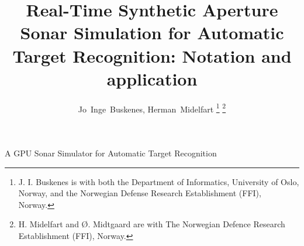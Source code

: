 
\suppressfloats


\title{Real-Time Synthetic Aperture Sonar Simulation for Automatic Target Recognition: Notation and application}

\author{{Jo~Inge~Buskenes, %
        Herman~Midelfart%
        } %
\thanks{J. I. Buskenes is with both the Department of Informatics, University of Oslo, Norway, and the Norwegian Defense Research Establishment (FFI), Norway.}%
\thanks{H. Midelfart and \O. Midtgaard are with The Norwegian Defence Research Establishment (FFI), Norway.}%
}

%
{A GPU Sonar Simulator for Automatic Target Recognition}




